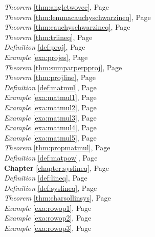 \begin{multicols}{3}
\begin{center}
      \textit{Theorem} \ref{thm:angletwovec}, Page \pageref{thm:angletwovec} \\
      \textit{Theorem} \ref{thm:lemmacauchyschwarzineq}, Page \pageref{thm:lemmacauchyschwarzineq} \\
      \textit{Theorem} \ref{thm:cauchyschwarzineq}, Page \pageref{thm:cauchyschwarzineq} \\
      \textit{Theorem} \ref{thm:triineq}, Page \pageref{thm:triineq} \\
      \textit{Definition} \ref{def:proj}, Page \pageref{def:proj} \\
      \textit{Example} \ref{exa:projes}, Page \pageref{exa:projes} \\
      \textit{Theorem} \ref{thm:sumparperpproj}, Page \pageref{thm:sumparperpproj} \\
      \textit{Theorem} \ref{thm:projline}, Page \pageref{thm:projline} \\
      \textit{Definition} \ref{def:matmul}, Page \pageref{def:matmul} \\
      \textit{Example} \ref{exa:matmul1}, Page \pageref{exa:matmul1} \\
      \textit{Example} \ref{exa:matmul2}, Page \pageref{exa:matmul2} \\
      \textit{Example} \ref{exa:matmul3}, Page \pageref{exa:matmul3} \\
      \textit{Example} \ref{exa:matmul4}, Page \pageref{exa:matmul4} \\
      \textit{Example} \ref{exa:matmul5}, Page \pageref{exa:matmul5} \\
      \textit{Theorem} \ref{thm:propmatmul}, Page \pageref{thm:propmatmul} \\
      \textit{Definition} \ref{def:matpow}, Page \pageref{def:matpow} \\
      \textbf{Chapter} \ref{chapter:syslineq}, Page \pageref{chapter:syslineq} \\
      \textit{Definition} \ref{def:lineq}, Page \pageref{def:lineq} \\
      \textit{Definition} \ref{def:syslineq}, Page \pageref{def:syslineq} \\
      \textit{Theorem} \ref{thm:charsollinsys}, Page \pageref{thm:charsollinsys} \\
      \textit{Example} \ref{exa:rowop1}, Page \pageref{exa:rowop1} \\
      \textit{Example} \ref{exa:rowop2}, Page \pageref{exa:rowop2} \\
      \textit{Example} \ref{exa:rowop3}, Page \pageref{exa:rowop3} \\

\end{center}
\end{multicols}
